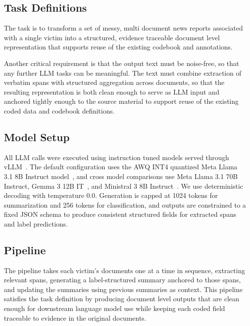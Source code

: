 \documentclass{article}
\begin{document}
\subsection{Task Definitions}\label{task-definitions}

The task is to transform a set of messy, multi document
news reports associated with a single victim into a structured, evidence
traceable document level representation that supports reuse of the
existing codebook and annotations.

Another critical requirement is that the output text must be noise-free,
so that any further LLM tasks can be meaningful. The text must combine
extraction of verbatim spans with structured aggregation across
documents, so that the resulting representation is both clean enough to
serve as LLM input and anchored tightly enough to the source material to
support reuse of the existing coded data and codebook definitions.


\subsection{Model Setup}\label{model-setup}

All LLM calls were executed using instruction tuned models served through vLLM~\cite{Kwon_etal2023}. The default configuration uses the AWQ INT4 quantized Meta Llama 3.1 8B Instruct model~\cite{Dubey_etal2024}, and cross model comparisons use Meta Llama 3.1 70B Instruct, Gemma 3 12B IT~\cite{GemmaTeam2025}, and Ministral 3 8B Instruct~\cite{MistralAI2026}. We use deterministic decoding with temperature 0.0. Generation is capped at 1024 tokens for summarization and 256 tokens for classification, and outputs are constrained to a fixed JSON schema to produce consistent structured fields for extracted spans and label predictions.

\subsection{Pipeline}\label{pipeline}

The pipeline takes each victim's documents one at a time in sequence,
extracting relevant spans, generating a label-structured summary
anchored to those spans, and updating the summaries using previous
summaries as context. This pipeline satisfies the task definition by
producing document level outputs that are clean enough for downstream
language model use while keeping each coded field traceable to evidence
in the original documents.
\end{document}
